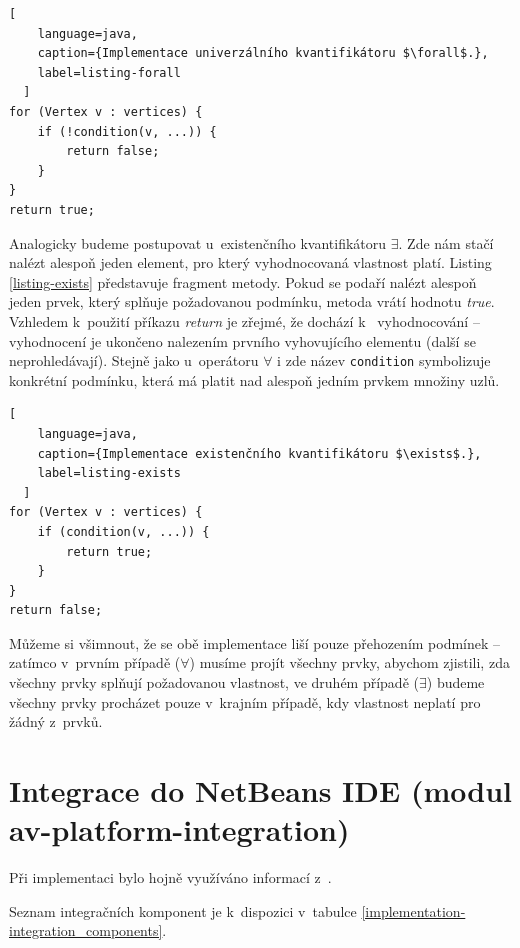 \begin{lstlisting}[
    language=java,
    caption={Implementace univerzálního kvantifikátoru $\forall$.},
    label=listing-forall
  ]
for (Vertex v : vertices) {
    if (!condition(v, ...)) {
        return false;
    }
}
return true;
\end{lstlisting}

Analogicky budeme postupovat u~existenčního kvantifikátoru $\exists$. Zde nám stačí nalézt alespoň jeden element, pro který vyhodnocovaná vlastnost platí. Listing \ref{listing-exists} představuje fragment metody. Pokud se podaří nalézt alespoň jeden prvek, který splňuje požadovanou podmínku, metoda vrátí hodnotu \emph{true}. Vzhledem k~použití příkazu \emph{return} je zřejmé, že dochází k~ vyhodnocování -- vyhodnocení je ukončeno nalezením prvního vyhovujícího elementu (další se neprohledávají). Stejně jako u~operátoru $\forall$ i zde název \verb+condition+ symbolizuje konkrétní podmínku, která má platit nad alespoň jedním prvkem množiny uzlů.

\begin{lstlisting}[
    language=java,
    caption={Implementace existenčního kvantifikátoru $\exists$.},
    label=listing-exists
  ]
for (Vertex v : vertices) {
    if (condition(v, ...)) {
        return true;
    }
}
return false;
\end{lstlisting}

Můžeme si všimnout, že se obě implementace liší pouze přehozením podmínek -- zatímco v~prvním případě ($\forall$) musíme projít všechny prvky, abychom zjistili, zda všechny prvky splňují požadovanou vlastnost, ve druhém případě ($\exists$) budeme všechny prvky procházet pouze v~krajním případě, kdy vlastnost neplatí pro žádný z~prvků.

\section{Integrace do NetBeans IDE (modul av-platform-integration)}

Při implementaci bylo hojně využíváno informací z~\cite{netbeans_platform}.

Seznam integračních komponent je k~dispozici v~tabulce \ref{implementation-integration_components}.

